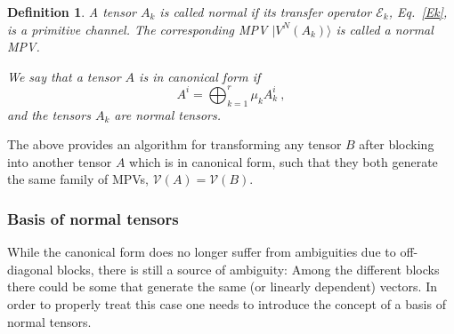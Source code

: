 \documentclass[rmp,aps,reprint,superscriptaddress,nobalancelastpage]{revtex4-1}
\newtheorem{defn}[thm]{Definition}
\begin{document}
\begin{defn}
    \label{def:4:normal-tensor-mps}
    A tensor $A_k$ is called \emph{normal} if its transfer operator $\mathcal E_k$, Eq.~\eqref{Ek}, is a primitive channel. The  corresponding MPV $|V^{N}(A_k)\rangle$ is called a \emph{normal MPV}.

    We say that a tensor $A$ is in \emph{canonical form} if
    \begin{equation}
        \label{eq:II_CF1}
        A^i = \bigoplus_{k=1}^r \mu_k A^i_k\ ,
    \end{equation}
    and the tensors $A_k$ are normal tensors.
\end{defn}

The above provides an algorithm for transforming any tensor $B$ after blocking into  another tensor $A$ which is in canonical form, such that they both generate the same family of MPVs, $\mathcal V(A)=\mathcal V(B)$.

\subsubsection{Basis of normal tensors}

While the canonical form does no longer suffer from ambiguities due to off-diagonal blocks, there is still a source of ambiguity:
Among the different blocks there could be some that generate the same (or linearly dependent) vectors. In order to properly treat this case one needs to introduce the concept of a basis of normal tensors.
\end{document}
